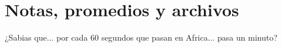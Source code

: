 \section{Notas, promedios y archivos}

¿Sabias que... por cada 60 segundos que pasan en Africa... pasa un minuto?


